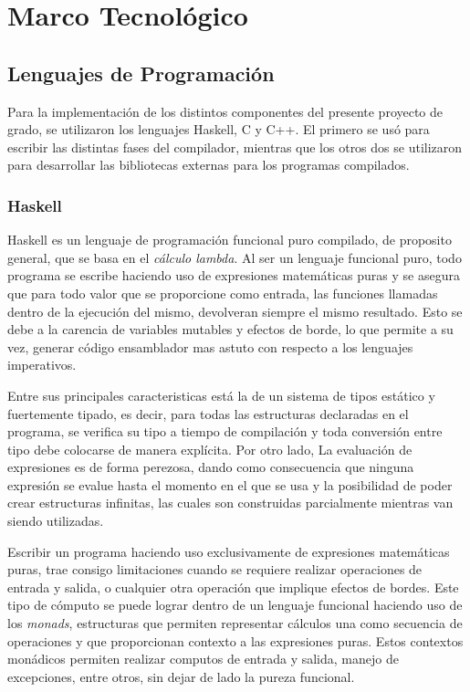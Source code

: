 \chapter{Marco Tecnológico}
\label{capitulo2}



\section{Lenguajes de Programación}

Para la implementación de los distintos componentes del presente proyecto de
grado, se utilizaron los lenguajes Haskell, C y C++. El primero se usó para
escribir las distintas fases del compilador, mientras que los otros dos se
utilizaron para desarrollar las bibliotecas externas para los programas
compilados.

\subsection{Haskell}
Haskell es un lenguaje de programación funcional puro compilado, de proposito
general, que se basa en el \textit{cálculo lambda}. Al ser un lenguaje
funcional puro, todo programa se escribe haciendo uso de expresiones
matemáticas puras y se asegura que para todo valor que se proporcione como
entrada, las funciones llamadas dentro de la ejecución del mismo, devolveran
siempre el mismo resultado. Esto se debe a la carencia de variables mutables y
efectos de borde, lo que permite a su vez, generar código ensamblador mas
astuto con respecto a los lenguajes imperativos.

Entre sus principales caracteristicas está la de un sistema de tipos estático
y fuertemente tipado, es decir, para todas las estructuras declaradas en el
programa, se verifica su tipo a tiempo de compilación y toda conversión entre
tipo debe colocarse de manera explícita. Por otro lado, La evaluación de
expresiones es de forma perezosa, dando como consecuencia que ninguna
expresión se evalue hasta el momento en el que se usa y la posibilidad de
poder crear estructuras infinitas, las cuales son construidas parcialmente
mientras van siendo utilizadas.

Escribir un programa haciendo uso exclusivamente de expresiones matemáticas
puras, trae consigo limitaciones cuando se requiere realizar operaciones de
entrada y salida, o cualquier otra operación que implique efectos de bordes.
Este tipo de cómputo se puede lograr dentro de un lenguaje funcional haciendo
uso de los \textit{monads}, estructuras que permiten representar cálculos una
como secuencia de operaciones y que proporcionan contexto a las expresiones
puras. Estos contextos monádicos permiten realizar computos de entrada y
salida, manejo de excepciones, entre otros, sin dejar de lado la pureza
funcional.

